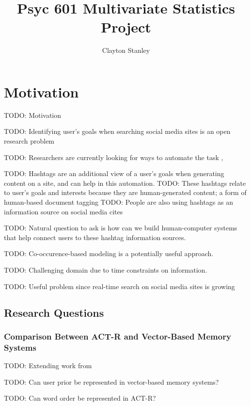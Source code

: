 \documentclass[man]{apa6}
\title{Psyc 601 Multivariate Statistics Project}
\author{Clayton Stanley}
\affiliation{Rice University}
\begin{document}
\maketitle

\tableofcontents
\newpage

\section{Motivation}

TODO: Motivation

TODO: Identifying user's goals when searching social media sites is an open research problem \cite{Rose2004}

TODO: Researchers are currently looking for ways to automate the task \cite{Lee2005}, \cite{Jansen2008}

TODO: Hashtags are an additional view of a user's goals when generating content on a site, and can help in this automation.
TODO: These hashtags relate to user's goals and interests because they are human-generated content; a form of human-based document tagging \cite{Chang2010}
TODO: People are also using hashtags as an information source on social media cites \cite{Diakopoulos2010} \cite{Kwak2010}

TODO: Natural question to ask is how can we build human-computer systems that help connect users to these hashtag information sources.

TODO: Co-occurence-based modeling is a potentially useful approach. \cite{Efron2010}

TODO: Challenging domain due to time constraints on information. \cite{Bauer2012}

TODO: Useful problem since real-time search on social media sites is growing \cite{Jansen2011}

\subsection{Research Questions}

\subsubsection{Comparison Between ACT-R and Vector-Based Memory Systems}

TODO: Extending work from \cite{Rutledge2008}

TODO: Can user prior be represented in vector-based memory systems?

TODO: Can word order be represented in ACT-R?
\end{document}
